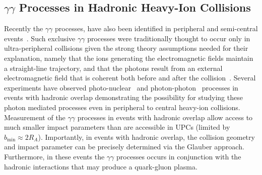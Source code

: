 \documentclass[12pt,epjc3]{svjour3}\sloppy
\begin{document}
\subsection{$\gamma\gamma$ Processes in Hadronic Heavy-Ion Collisions}
Recently the $\gamma\gamma$ processes, have also been identified in peripheral and semi-central events~\cite{starcollaborationLowEnsuremathPair2018b,alicecollaborationMeasurementExcessYield2016b,atlascollaborationObservationCentralityDependentAcoplanarity2018a}. 
Such exclusive $\gamma\gamma$ processes were traditionally thought to occur only in ultra-peripheral collisions given the strong theory assumptions needed for their explanation, namely that the ions generating the electromagnetic fields maintain a straight-line trajectory, and that the photons result from an external electromagnetic field that is coherent both before and after the collision~\cite{zhaCoherentEnsuremathPsi2018}.
Several experiments have observed photo-nuclear~\cite{alicecollaborationMeasurementExcessYield2016b,starcollaborationObservationExcessPsi2019} and photon-photon~\cite{starcollaborationLowEnsuremathPair2018b,atlascollaborationObservationCentralityDependentAcoplanarity2018a} processes in events with hadronic overlap demonstrating the possibility for studying these photon mediated processes even in peripheral to central heavy-ion collisions. 
Measurement of the $\gamma\gamma$ processes in events with hadronic overlap allow access to much smaller impact parameters than are accessible in UPCs (limited by $b_{\min} \approx 2R_{A} $). 
Importantly, in events with hadronic overlap, the collision geometry and impact parameter can be precisely determined via the Glauber approach\cite{millerGlauberModelingHigh2007b,alicecollaborationCentralityDeterminationPbPb2013}.
Furthermore, in these events the $\gamma\gamma$ processes occurs in conjunction with the hadronic interactions that may produce a quark-gluon plasma. 
\end{document}
